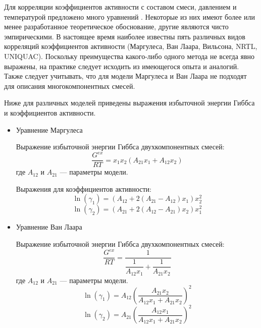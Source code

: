 Для корреляции коэффициентов активности с составом смеси, давлением и температурой предложено много уравнений \cite{rid1982,yelles1989}. Некоторые из них имеют более или менее разработанное теоретическое обоснование, другие являются чисто эмпирическими. В настоящее время наиболее известны пять различных видов корреляций коэффициентов активности (Маргулеса, Ван Лаара, Вильсона, NRTL, UNIQUAC). Поскольку преимущества какого-либо одного метода не всегда явно выражены, на практике следует исходить из имеющегося опыта и аналогий. Также следует учитывать, что для модели Маргулеса и Ван Лаара не подходят для описания многокомпонентных смесей.

Ниже для различных моделей приведены выражения избыточной энергии Гиббса и коэффициентов активности.
\begin{itemize}
	\item Уравнение Маргулеса
	
	Выражение избыточной энергии Гиббса двухкомпонентных смесей:
	\begin{equation}\label{eq.phase.gemarg}
	\frac{G^{ex}}{RT}=x_1 x_2 (A_{21} x_1+ A_{12} x_2)
	\end{equation}
	где $A_{12}$ и $A_{21}$ --- параметры модели.
	
	Выражения для коэффициентов активности:
	\begin{equation} \label{eq.phase.ga1marg}
	\ln(\gamma_1)=(A_{12}+2(A_{21}-A_{12})x_1)x_2^2
	\end{equation}
	\begin{equation} \label{eq.phase.ga2marg}
	\ln(\gamma_2)=(A_{21}+2(A_{12}-A_{21})x_2)x_1^2
	\end{equation}
	
	\item Уравнение Ван Лаара
	
	Выражение избыточной энергии Гиббса двухкомпонентных смесей:
	\begin{equation}\label{eq.phase.gewlar}
	\frac{G^{ex}}{RT}=\dfrac{1}{\dfrac{1}{A_{12} x_1}+ \dfrac{1}{A_{21}x_2}}
	\end{equation}
	где $A_{12}$ и $A_{21}$ --- параметры модели.
	\begin{equation}
	\ln(\gamma_1)=A_{12}\left( \dfrac{A_{21}x_2}{A_{12}x_1 + A_{21} x_2}\right)^2
	\end{equation}
	\begin{equation}
	\ln(\gamma_2)=A_{21}\left( \dfrac{A_{12}x_1}{A_{12}x_1 + A_{21} x_2}\right)^2
	\end{equation}
	

\end{itemize}
